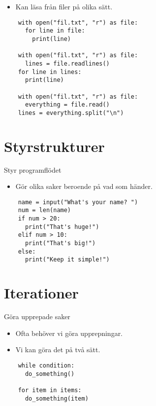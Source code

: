 \begin{frame}[fragile]
  \begin{remark}
    \begin{itemize}
      \item Kan läsa från filer på olika sätt.
    \end{itemize}
  \end{remark}

  \begin{verbatim}
    with open("fil.txt", "r") as file:
      for line in file:
        print(line)

    with open("fil.txt", "r") as file:
      lines = file.readlines()
    for line in lines:
      print(line)

    with open("fil.txt", "r") as file:
      everything = file.read()
    lines = everything.split("\n")
  \end{verbatim}
\end{frame}


\section{Styrstrukturer}

\begin{frame}[fragile]
  \begin{block}{Styr programflödet}
    \begin{itemize}
      \item Gör olika saker beroende på vad som händer.
    \end{itemize}
  \end{block}

  \begin{verbatim}
    name = input("What's your name? ")
    num = len(name)
    if num > 20:
      print("That's huge!")
    elif num > 10:
      print("That's big!")
    else:
      print("Keep it simple!")
  \end{verbatim}
\end{frame}


\section{Iterationer}

\begin{frame}[fragile]
  \begin{block}{Göra upprepade saker}
    \begin{itemize}
      \item Ofta behöver vi göra upprepningar.
      \item Vi kan göra det på två sätt.
    \end{itemize}
  \end{block}

  \begin{verbatim}
    while condition:
      do_something()

    for item in items:
      do_something(item)
  \end{verbatim}
\end{frame}

